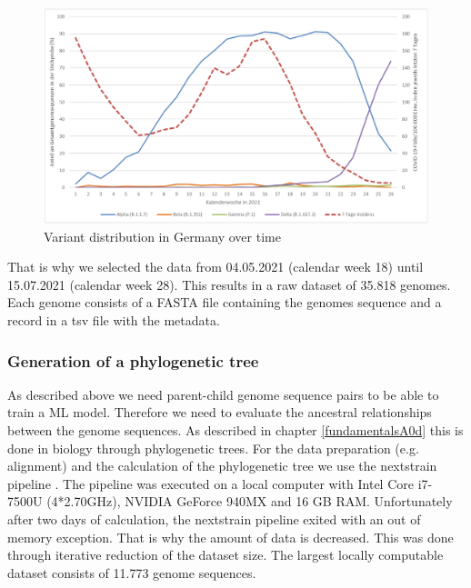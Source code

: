 \begin{figure}[ht]
	\centering
	\includegraphics[width=1.0\linewidth]{figures/rkiVariantDistribution.png}
	\caption{Variant distribution in Germany over time \cite{robertkochinstituteditorBerichtVirusvariantenSARSCoV22021}}
	\label{rkiVariantDistribution}
\end{figure}

That is why we selected the data from 04.05.2021 (calendar week 18) until 15.07.2021 (calendar week 28). This results in a raw dataset of 35.818 genomes.
Each genome consists of a FASTA file containing the genomes sequence and a record in a tsv file with the metadata.



\subsubsection{Generation of a phylogenetic tree}
\label{ch:approachAb}

As described above we need parent-child genome sequence pairs to be able to train a \ac{ML} model. Therefore we need to evaluate the ancestral relationships between the genome sequences.
As described in chapter \ref{fundamentalsA0d} this is done in biology through phylogenetic trees.
For the data preparation (e.g. alignment) and the calculation of the phylogenetic tree we use the nextstrain pipeline \cite{10.1093/bioinformatics/bty407}.
The pipeline was executed on a local computer with Intel Core i7-7500U (4*2.70GHz), NVIDIA GeForce 940MX and 16 GB RAM.
Unfortunately after two days of calculation, the nextstrain pipeline exited with an out of memory exception. That is why the amount of data is decreased. This was done through iterative reduction of the dataset size. The largest locally computable dataset consists of 11.773 genome sequences.

